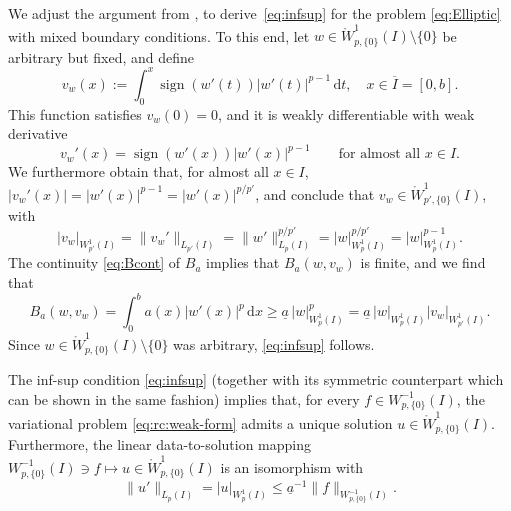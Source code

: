 \documentclass[reqno]{amsart}
\numberwithin{equation}{section}
\newcommand{\norm}[2]{     \| #1       \|_{ #2 }}
\newcommand{\seminorm}[2]{  | #1        |_{ #2 }}
\newcommand{\rd}{\mathrm{d}}
\newcommand{\Wo}{\mathring{W}}
\theoremstyle{remark}
\theoremstyle{definition}
\begin{document}
We adjust the argument 
from \cite{BabuskaRheinboldt1981}, 
to derive~\eqref{eq:infsup} 
for the problem \eqref{eq:Elliptic} 
with mixed boundary conditions. 
% 
To this end, 
let  
$w\in \Wo^1_{p,\{0\}}(I) \setminus\{ 0 \}$ 
be arbitrary but fixed, 
and define
%
\begin{equation}\label{eq:def:vw}
v_w(x) 
:= 
\int_0^x \operatorname{sign}( w'(t) ) |w'(t)|^{p-1} \, \rd t, 
\quad  
x \in\overline{I} = [0,b].
\end{equation}
%
This function satisfies  
$v_w(0) = 0$, 
and it is weakly differentiable with 
weak derivative 
% 
\[
v_w'(x) 
= 
\operatorname{sign}( w'(x) ) |w'(x)|^{p-1} 
\qquad 
\text{for almost all }x\in I. 
\]
% 
We furthermore obtain that, 
for almost all $x\in I$,  
$|v_w'(x)| 
=  
|w'(x)|^{p-1} 
=
|w'(x)|^{p/p'}$\!, 
% 
and conclude that $v_w\in \Wo^1_{p'\!,\{0\}}(I)$, 
with  
%
\[ 
\seminorm{ v_w }{ W^1_{p'}(I)} 
= 
\norm{ v_w' }{L_{p'}(I)} 
=  
\norm{ w' }{L_p(I)} ^{p/p'} 
=  
\seminorm{ w }{W^1_p(I)}^{p/p'} 
= 
\seminorm{ w }{W^1_p(I)}^{p-1} . 
\] 
%
The continuity \eqref{eq:Bcont}
of $B_a$ implies that $B_a(w, v_w)$ is finite, 
and we find that 
%
\[
B_a(w,v_w) 
= 
\int_0^b a(x) |w'(x)|^p \,\rd x 
\geq 
\underline{a} \, 
\seminorm{ w }{W^1_p(I)}^p 
= 
\underline{a} \, 
\seminorm{ w }{W^1_p(I)} 
\seminorm{ v_w }{W^1_{p'}(I)}. 
\]
%
Since $w\in \Wo^1_{p,\{0\}}(I)\setminus\{0\}$ was arbitrary, 
\eqref{eq:infsup} follows. 
%

The inf-sup condition \eqref{eq:infsup} 
(together with its symmetric counterpart 
which can be shown in the same fashion)
implies that, 
for every $f\in W^{-1}_{p,\{0\}}(I)$,
the variational problem \eqref{eq:rc:weak-form} 
admits a unique solution
$u\in \Wo^1_{p,\{0\}}(I)$. 
Furthermore, 
the linear data-to-solution mapping 
$W^{-1}_{p,\{0\}}(I) \ni f\mapsto u\in \Wo^1_{p,\{0\}}(I)$
is an isomorphism with 
% 
\begin{equation}\label{eq:rc:stab-u}
\norm{ u' }{L_p(I)} 
=
\seminorm{ u }{W^1_p(I)} 
\leq 
\underline{a}^{-1} 
\norm{f}{W^{-1}_{p,\{0\}}(I)} . 
\end{equation}
% 
\end{document}
